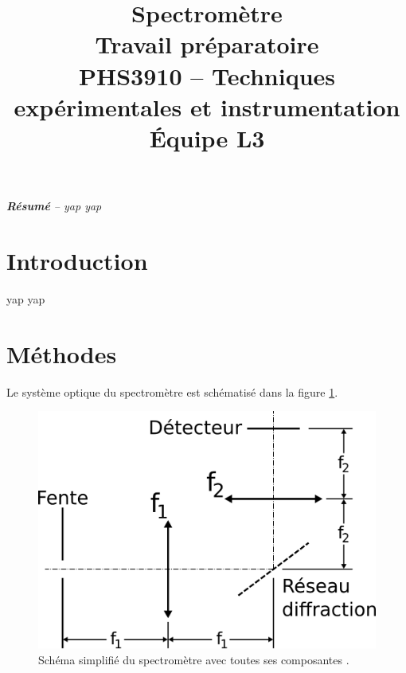 \documentclass[conference]{IEEEtran}
\begin{document}
\title{Spectromètre\\
\large Travail préparatoire \\
PHS3910 -- Techniques expérimentales et instrumentation\\ 
Équipe L3}

\author{
\and
{}
\and
{}
\and
{}
}

\maketitle

\textit{\textbf{Résumé} -- yap yap}

\section{Introduction}
yap yap

\section{Méthodes \label{methodes}}

Le système optique du spectromètre est schématisé dans la figure \ref{4f}.

\begin{figure}[H]
    \centering
    \includegraphics[scale=0.4]{4f.png}
    \caption{Schéma simplifié du spectromètre avec toutes ses composantes \cite{procedurier}. \label{4f}}
\end{figure}
\end{document}
